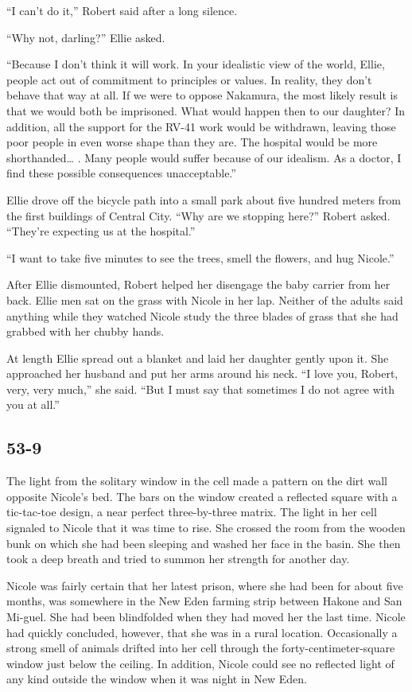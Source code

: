 \documentclass[]{article}
\begin{document}
{{“I can’t do it,” Robert said after a long silence.

“Why not, darling?” Ellie asked.

“Because I don’t think it will work.  In your idealistic view of the world, Ellie, people act out of commitment to principles or values.  In reality, they don’t behave that way at all.  If we were to oppose Nakamura, the most likely result is that we would both be imprisoned.  What would happen then to our daughter? In addition, all the support for the RV-41 work would be withdrawn, leaving those poor people in even worse shape than they are.  The hospital would be more shorthanded… .  Many people would suffer because of our idealism.  As a doctor, I find these possible consequences unacceptable.”

Ellie drove off the bicycle path into a small park about five hundred meters from the first buildings of Central City.  “Why are we stopping here?” Robert asked.  “They’re expecting us at the hospital.”

“I want to take five minutes to see the trees, smell the flowers, and hug Nicole.”

After Ellie dismounted, Robert helped her disengage the baby carrier from her back.  Ellie men sat on the grass with Nicole in her lap.  Neither of the adults said anything while they watched Nicole study the three blades of grass that she had grabbed with her chubby hands.

At length Ellie spread out a blanket and laid her daughter gently upon it.  She approached her husband and put her arms around his neck.  “I love you, Robert, very, very much,” she said.  “But I must say that sometimes I do not agree with you at all.”


\subsection*{53-9}

The light from the solitary window in the cell made a pattern on the dirt wall opposite Nicole’s bed.  The bars on the window created a reflected square with a tic-tac-toe design, a near perfect three-by-three matrix.  The light in her cell signaled to Nicole that it was time to rise.  She crossed the room from the wooden bunk on which she had been sleeping and washed her face in the basin.  She then took a deep breath and tried to summon her strength for another day.

Nicole was fairly certain that her latest prison, where she had been for about five months, was somewhere in the New Eden farming strip between Hakone and San Mi-guel.  She had been blindfolded when they had moved her the last time.  Nicole had quickly concluded, however, that she was in a rural location.  Occasionally a strong smell of animals drifted into her cell through the forty-centimeter-square window just below the ceiling.  In addition, Nicole could see no reflected light of any kind outside the window when it was night in New Eden.

}}
\end{document}
